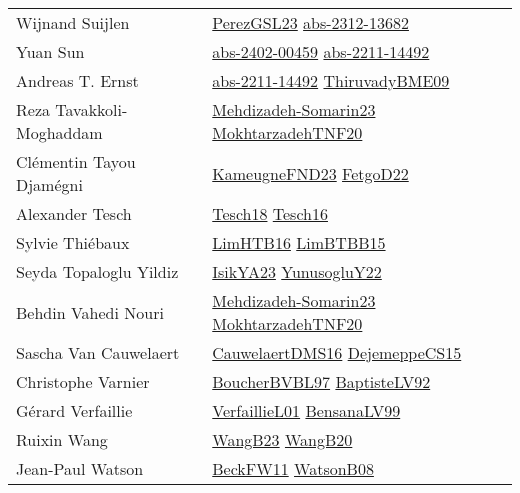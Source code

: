 {\begin{longtable}{p{4cm}p{20cm}}
Wijnand Suijlen & \href{papers/PerezGSL23.pdf}{PerezGSL23}\cite{PerezGSL23} \href{articles/abs-2312-13682.pdf}{abs-2312-13682}\cite{abs-2312-13682} \\
Yuan Sun & \href{articles/abs-2402-00459.pdf}{abs-2402-00459}\cite{abs-2402-00459} \href{articles/abs-2211-14492.pdf}{abs-2211-14492}\cite{abs-2211-14492} \\
Andreas T. Ernst & \href{articles/abs-2211-14492.pdf}{abs-2211-14492}\cite{abs-2211-14492} \href{papers/ThiruvadyBME09.pdf}{ThiruvadyBME09}\cite{ThiruvadyBME09} \\
Reza Tavakkoli{-}Moghaddam & \href{papers/Mehdizadeh-Somarin23.pdf}{Mehdizadeh-Somarin23}\cite{Mehdizadeh-Somarin23} \href{articles/MokhtarzadehTNF20.pdf}{MokhtarzadehTNF20}\cite{MokhtarzadehTNF20} \\
Cl{\'{e}}mentin Tayou Djam{\'{e}}gni & \href{papers/KameugneFND23.pdf}{KameugneFND23}\cite{KameugneFND23} \href{articles/FetgoD22.pdf}{FetgoD22}\cite{FetgoD22} \\
Alexander Tesch & \href{papers/Tesch18.pdf}{Tesch18}\cite{Tesch18} \href{papers/Tesch16.pdf}{Tesch16}\cite{Tesch16} \\
Sylvie Thi{\'{e}}baux & \href{papers/LimHTB16.pdf}{LimHTB16}\cite{LimHTB16} \href{papers/LimBTBB15.pdf}{LimBTBB15}\cite{LimBTBB15} \\
Seyda Topaloglu Yildiz & \href{articles/IsikYA23.pdf}{IsikYA23}\cite{IsikYA23} \href{articles/YunusogluY22.pdf}{YunusogluY22}\cite{YunusogluY22} \\
Behdin Vahedi Nouri & \href{papers/Mehdizadeh-Somarin23.pdf}{Mehdizadeh-Somarin23}\cite{Mehdizadeh-Somarin23} \href{articles/MokhtarzadehTNF20.pdf}{MokhtarzadehTNF20}\cite{MokhtarzadehTNF20} \\
Sascha Van Cauwelaert & \href{papers/CauwelaertDMS16.pdf}{CauwelaertDMS16}\cite{CauwelaertDMS16} \href{papers/DejemeppeCS15.pdf}{DejemeppeCS15}\cite{DejemeppeCS15} \\
Christophe Varnier & \href{papers/BoucherBVBL97.pdf}{BoucherBVBL97}\cite{BoucherBVBL97} \href{papers/BaptisteLV92.pdf}{BaptisteLV92}\cite{BaptisteLV92} \\
G{\'{e}}rard Verfaillie & \href{papers/VerfaillieL01.pdf}{VerfaillieL01}\cite{VerfaillieL01} \href{articles/BensanaLV99.pdf}{BensanaLV99}\cite{BensanaLV99} \\
Ruixin Wang & \href{papers/WangB23.pdf}{WangB23}\cite{WangB23} \href{papers/WangB20.pdf}{WangB20}\cite{WangB20} \\
Jean{-}Paul Watson & \href{articles/BeckFW11.pdf}{BeckFW11}\cite{BeckFW11} \href{papers/WatsonB08.pdf}{WatsonB08}\cite{WatsonB08} \\

\end{longtable}}
